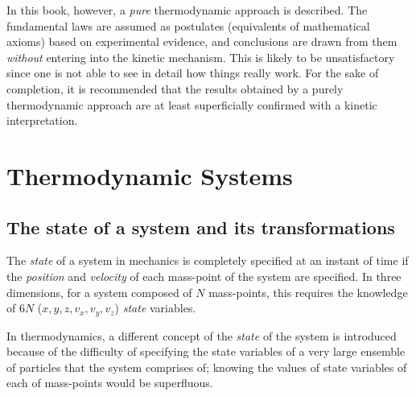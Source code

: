 \documentclass[11pt]{article}         %
\begin{document}
In this book, however, a \emph{pure} thermodynamic approach is described. The fundamental laws are assumed as postulates (equivalents of mathematical axioms) based on experimental evidence, and conclusions are drawn from them \emph{without} entering into the kinetic mechanism. This is likely to be unsatisfactory since one is not able to see in detail how things really work. For the sake of completion, it is recommended that the results obtained by a purely thermodynamic approach are at least superficially confirmed with a kinetic interpretation.

\section{Thermodynamic Systems}
\label{sec: thermosys}
\subsection{The state of a system and its transformations}
\label{sec: state-transformations}

The \emph{state} of a system in mechanics is completely specified at an instant of time if the \emph{position} and \emph{velocity} of each mass-point of the system are specified. In three dimensions, for a system composed of $N$ mass-points, this requires the knowledge of $6N$ ($x, y, z, v_x, v_y, v_z$) \emph{state} variables.

In thermodynamics, a different concept of the \emph{state} of the system is introduced because of the difficulty of specifying the state variables of a very large ensemble of particles that the system comprises of; knowing the values of state variables of each of mass-points would be superfluous.
\end{document}
